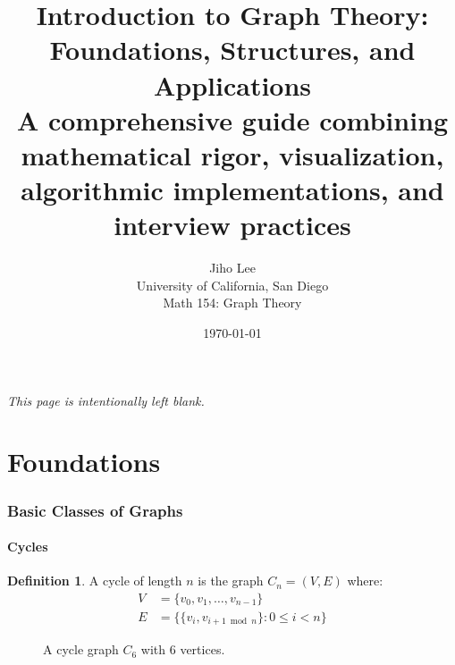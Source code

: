 \documentclass{article}
\title{\Huge\bfseries Introduction to Graph Theory: Foundations, Structures, and Applications \\[1em]
\Large A comprehensive guide combining mathematical rigor, visualization, algorithmic implementations, and interview practices}
\author{\Large Jiho Lee \\ University of California, San Diego \\[1em] \Large Math 154: Graph Theory}
\date{\Large\today}
\theoremstyle{definition}
\newtheorem{definition}{Definition}
\begin{document}
\begin{titlepage}
    \maketitle
    \thispagestyle{empty}
\end{titlepage}

\newpage
\tableofcontents

\newpage
\thispagestyle{empty}
\vspace*{\fill}
\begin{center}
    \textit{This page is intentionally left blank.}
\end{center}
\vspace*{\fill}
\newpage
\part{Foundations}


\section{Basic Classes of Graphs}

\subsection{Cycles}
\begin{definition}
A cycle of length $n$ is the graph $C_n = (V, E)$ where:
\begin{align*}
V &= \{v_0, v_1, \ldots, v_{n-1}\}\\
E &= \{\{v_i, v_{i+1 \bmod n}\} : 0 \leq i < n\}
\end{align*}
\end{definition}

\begin{figure}[H]
\centering
{}
\caption{A cycle graph $C_6$ with 6 vertices.}
\end{figure}
\end{document}
